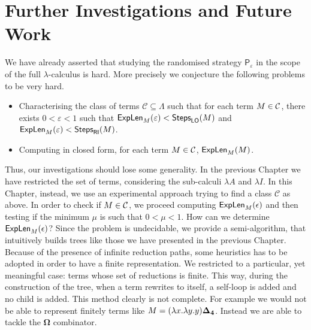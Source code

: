 \chapter{Further Investigations and Future Work}
We have already asserted that studying the randomised strategy $\mathsf{P}_\varepsilon$ in the scope of the full $\lambda$-calculus is hard. More precisely we conjecture the following problems to be very hard.
\begin{itemize}
	\item Characterising the class of terms $\mathcal{C}\subseteq\Lambda$ such that for each term $M\in\mathcal{C}$, there exists $0<\varepsilon<1$ such that $\textsf{ExpLen}_{M}(\varepsilon)<\textsf{Steps}_{\textsf{LO}}(M)$ and $\textsf{ExpLen}_{M}(\varepsilon)<\textsf{Steps}_{\textsf{RI}}(M)$.
	\item Computing in closed form, for each term $M\in\mathcal{C}$, $\textsf{ExpLen}_{M}(M)$.
\end{itemize}
Thus, our investigations should lose some generality. In the previous Chapter we have restricted the set of terms, considering the sub-calculi $\lambda A$ and $\lambda I$. In this Chapter, instead, we use an experimental approach trying to find a class $\mathcal{C}$ as above. In order to check if $M\in\mathcal{C}$, we proceed computing $\textsf{ExpLen}_{M}(\epsilon)$ and then testing if the minimum $\mu$ is such that $0<\mu<1$. How can we determine $\textsf{ExpLen}_{M}(\epsilon)$? Since the problem is undecidable, we provide a semi-algorithm, that intuitively builds trees like those we have presented in the previous Chapter. Because of the presence of infinite reduction paths, some heuristics has to be adopted in order to have a finite representation. We restricted to a particular, yet meaningful case: terms whose set of reductions is finite. This way, during the construction of the tree, when a term rewrites to itself, a self-loop is added and no child is added. This method clearly is not complete. For example we would not be able to represent finitely terms like $M = (\lambda x.\lambda y.y)\bm{\Delta_4}$. Instead we are able to tackle the $\bm{\Omega}$ combinator.

